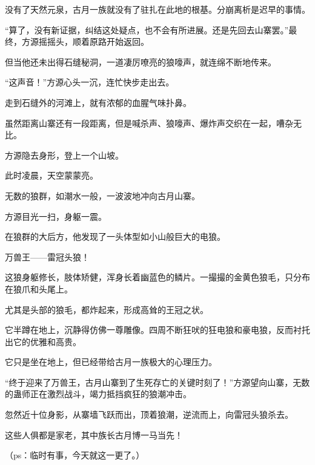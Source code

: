 \begin{this_body}
没有了天然元泉，古月一族就没有了驻扎在此地的根基。分崩离析是迟早的事情。

“算了，没有新证据，纠结这处疑点，也不会有所进展。还是先回去山寨罢。”最终，方源摇摇头，顺着原路开始返回。

但当他还未出得石缝秘洞，一道凄厉嘹亮的狼嚎声，就连绵不断地传来。

“这声音！”方源心头一沉，连忙快步走出去。

走到石缝外的河滩上，就有浓郁的血腥气味扑鼻。

虽然距离山寨还有一段距离，但是喊杀声、狼嚎声、爆炸声交织在一起，嘈杂无比。

方源隐去身形，登上一个山坡。

此时凌晨，天空蒙蒙亮。

无数的狼群，如潮水一般，一波波地冲向古月山寨。

方源目光一扫，身躯一震。

在狼群的大后方，他发现了一头体型如小山般巨大的电狼。

万兽王——雷冠头狼！

这狼身躯修长，肢体矫健，浑身长着幽蓝色的鳞片。一撮撮的金黄色狼毛，只分布在狼爪和头尾上。

尤其是头部的狼毛，都炸起来，形成高耸的王冠之状。

它半蹲在地上，沉静得仿佛一尊雕像。四周不断狂吠的狂电狼和豪电狼，反而衬托出它的优雅和高贵。

它只是坐在地上，但已经带给古月一族极大的心理压力。

“终于迎来了万兽王，古月山寨到了生死存亡的关键时刻了！”方源望向山寨，无数的蛊师正在激烈战斗，竭力抵挡疯狂的狼潮冲击。

忽然近十位身影，从寨墙飞跃而出，顶着狼潮，逆流而上，向雷冠头狼杀去。

这些人俱都是家老，其中族长古月博一马当先！

（ps：临时有事，今天就这一更了。）

\end{this_body}

